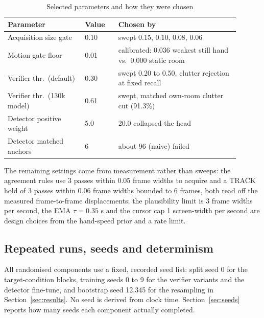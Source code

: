 \documentclass[conference,a4paper]{IEEEtran}
\begin{document}
\begin{table}[t]
\caption{Selected parameters and how they were chosen}
\label{tab:params}
\centering
\footnotesize
\begin{tabular}{@{}p{0.30\linewidth}p{0.13\linewidth}p{0.47\linewidth}@{}}
\toprule
Parameter & Value & Chosen by \\
\midrule
Acquisition size gate & 0.10 & swept 0.15, 0.10, 0.08, 0.06 \\
Motion gate floor & 0.01 & calibrated: 0.036 weakest still hand vs.\ 0.000 static room \\
Verifier thr.\ (default) & 0.30 & swept 0.20 to 0.50, clutter rejection at fixed recall \\
Verifier thr.\ (130k model) & 0.61 & swept, matched own-room clutter cut (91.3\%) \\
Detector positive weight & 5.0 & 20.0 collapsed the head \\
Detector matched anchors & 6 & about 96 (naive) failed \\
\bottomrule
\end{tabular}
\end{table}

The remaining settings come from measurement rather than sweeps: the
agreement rules use 3 passes within 0.05 frame widths to acquire and a TRACK
hold of 3 passes within 0.06 frame widths bounded to 6 frames, both read off
the measured frame-to-frame displacements; the plausibility limit is 3 frame
widths per second, the EMA $\tau=0.35$ s and the cursor cap 1 screen-width
per second are design choices from the hand-speed prior and a rate limit.

\subsection{Repeated runs, seeds and determinism}
All randomised components use a fixed, recorded seed list: split seed 0 for
the target-condition blocks, training seeds 0 to 9 for the verifier
variants and the detector fine-tune, and bootstrap seed 12{,}345 for the
resampling in Section~\ref{sec:results}. No seed is derived from clock
time. Section~\ref{sec:seeds} reports how many seeds each component
actually completed.
\end{document}
